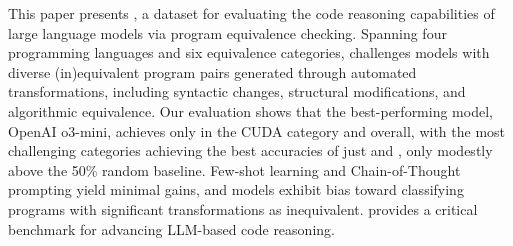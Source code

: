 This paper presents \name{}, a dataset for evaluating the code reasoning capabilities of large language models via program equivalence checking. Spanning four programming languages and six equivalence categories, \name{} challenges models with diverse (in)equivalent program pairs generated through automated transformations, including syntactic changes, structural modifications, and algorithmic equivalence. Our evaluation shows that the best-performing model, OpenAI o3-mini, achieves only \sotalowacc{} in the CUDA category and \sotaacc{} overall, with the most challenging categories achieving the best accuracies of just \sotacuda{} and \sotadce{}, only modestly above the 50\% random baseline. Few-shot learning and Chain-of-Thought prompting yield minimal gains, and models exhibit bias toward classifying programs with significant transformations as inequivalent. \name{} provides a critical benchmark for advancing LLM-based code reasoning.